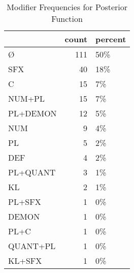 \begin{table}[htbp!]
\centering
\caption{Modifier Frequencies for Posterior Function}
\label{table:post_mod_cp}
\begin{tabular}{lrl}
\toprule
{} &  count & percent \\
\midrule
Ø        &    111 &     50\% \\
SFX      &     40 &     18\% \\
C        &     15 &      7\% \\
NUM+PL   &     15 &      7\% \\
PL+DEMON &     12 &      5\% \\
NUM      &      9 &      4\% \\
PL       &      5 &      2\% \\
DEF      &      4 &      2\% \\
PL+QUANT &      3 &      1\% \\
KL       &      2 &      1\% \\
PL+SFX   &      1 &      0\% \\
DEMON    &      1 &      0\% \\
PL+C     &      1 &      0\% \\
QUANT+PL &      1 &      0\% \\
KL+SFX   &      1 &      0\% \\
\bottomrule
\end{tabular}
\end{table}
